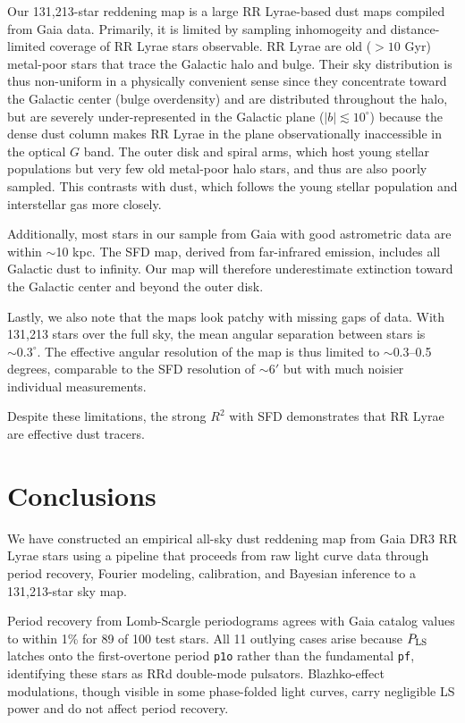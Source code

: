 \documentclass[10pt,preprint2]{aastex}
\begin{document}
Our 131,213-star reddening map is a large RR Lyrae-based dust maps compiled from Gaia data. Primarily, it is limited by sampling inhomogeity and distance-limited coverage of RR Lyrae stars observable. RR Lyrae are old ($>10$ Gyr) metal-poor stars that trace the Galactic halo and bulge. Their sky distribution is thus non-uniform in a physically convenient sense since they concentrate toward the Galactic center (bulge overdensity) and are distributed throughout the halo, but are severely under-represented in the Galactic plane ($|b| \lesssim 10^\circ$) because the dense dust column makes RR Lyrae in the plane observationally inaccessible in the optical $G$ band. The outer disk and spiral arms, which host young stellar populations but very few old metal-poor halo stars, and thus are also poorly sampled. This contrasts with dust, which follows the young stellar population and interstellar gas more closely.

Additionally, most stars in our sample from Gaia with good astrometric data are within $\sim$10 kpc. The SFD map, derived from far-infrared emission, includes all Galactic dust to infinity. Our map will therefore underestimate extinction toward the Galactic center and beyond the outer disk.

Lastly, we also note that the maps look patchy with missing gaps of data. With 131,213 stars over the full sky, the mean angular separation between stars is $\sim 0.3^\circ$. The effective angular resolution of the map is thus limited to $\sim$0.3--0.5 degrees, comparable to the SFD resolution of $\sim 6'$ but with much noisier individual measurements.

Despite these limitations, the strong $R^2$ with SFD demonstrates that RR Lyrae are effective dust tracers.

\section{Conclusions}
\label{sec:conclusions}

We have constructed an empirical all-sky dust reddening map from Gaia DR3 RR Lyrae stars using a pipeline that proceeds from raw light curve data through period recovery, Fourier modeling, calibration, and Bayesian inference to a 131,213-star sky map.

Period recovery from Lomb-Scargle periodograms agrees with Gaia catalog values to within 1\% for 89 of 100 test stars. All 11 outlying cases arise because $P_{\rm LS}$ latches onto the first-overtone period \texttt{p1o} rather than the fundamental \texttt{pf}, identifying these stars as RRd double-mode pulsators. Blazhko-effect modulations, though visible in some phase-folded light curves, carry negligible LS power and do not affect period recovery.
\end{document}
